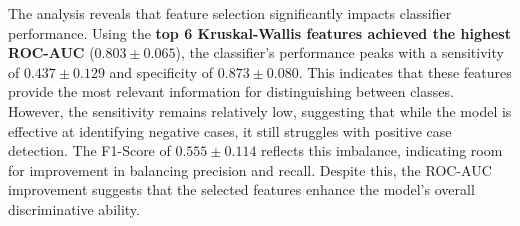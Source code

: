 \documentclass[12pt,a4paper]{article}
\begin{document}
\begin{table}[H]
    \centering
    \caption{Bayes Classifier Performance with Top N Kruskal-Wallis Features (Mean $\pm$ SD).}
    \label{tab:bayes_kruskal_features}
\end{table}

The analysis reveals that feature selection significantly impacts classifier performance. Using the \textbf{top 6 Kruskal-Wallis features achieved the highest ROC-AUC} ($0.803 \pm 0.065$), the classifier's performance peaks with a sensitivity of $0.437 \pm 0.129$ and specificity of $0.873 \pm 0.080$. This indicates that these features provide the most relevant information for distinguishing between classes. However, the sensitivity remains relatively low, suggesting that while the model is effective at identifying negative cases, it still struggles with positive case detection. The F1-Score of $0.555 \pm 0.114$ reflects this imbalance, indicating room for improvement in balancing precision and recall. Despite this, the ROC-AUC improvement suggests that the selected features enhance the model's overall discriminative ability.
\end{document}
